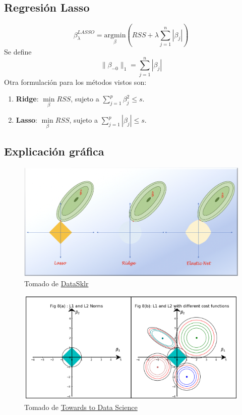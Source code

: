\documentclass[
  12pt,
]{book}
\providecommand{\tightlist}{%
  \setlength{\itemsep}{0pt}\setlength{\parskip}{0pt}}
\theoremstyle{definition}
\theoremstyle{definition}
\theoremstyle{definition}
\theoremstyle{remark}
\begin{document}
\hypertarget{regresiuxf3n-lasso}{%
\subsection{Regresión Lasso}\label{regresiuxf3n-lasso}}

\[ \beta_{\lambda}^{LASSO} = \underset{\beta}{\mathrm{argmin}}\left(RSS + \lambda\sum_{j=1}^n |\beta_j|\right)\]
Se define
\[ \|\beta_{-0}\|_1 = \sum_{j=1}^n|\beta_j|\]
Otra formulación para los métodos vistos son:

\begin{enumerate}
\def\labelenumi{\arabic{enumi}.}
\tightlist
\item
  \textbf{Ridge}: \(\underset{\beta}{\min} RSS\), sujeto a \(\displaystyle\sum_{j=1}^p\beta_j^2 \leq s\).
\item
  \textbf{Lasso}: \(\underset{\beta}{\min} RSS\), sujeto a \(\displaystyle\sum_{j=1}^p|\beta_j| \leq s\).
\end{enumerate}

\hypertarget{explicaciuxf3n-gruxe1fica}{%
\subsection{Explicación gráfica}\label{explicaciuxf3n-gruxe1fica}}

\begin{figure}
\centering
\includegraphics{manual_figures/ridge-lasso.png}
\caption{Tomado de \href{https://www.datasklr.com/extensions-of-ols-regression/regularization-and-shrinkage-ridge-lasso-and-elastic-net-regression}{DataSklr}}
\end{figure}

\begin{figure}
\centering
\includegraphics{manual_figures/ridge-lasso2.png}
\caption{Tomado de \href{https://towardsdatascience.com/regularization-in-machine-learning-connecting-the-dots-c6e030bfaddd}{Towards to Data Science}}
\end{figure}
\end{document}
